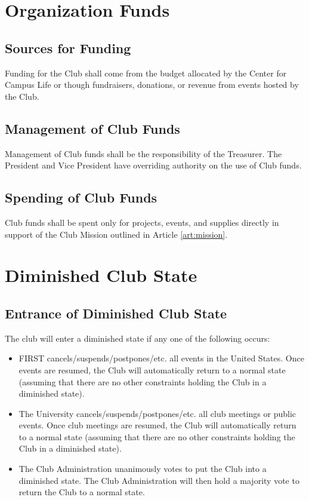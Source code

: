 \documentclass[english,11pt]{article}
\begin{document}
\section{Organization Funds} \label{art:funds}

\subsection{Sources for Funding} \label{sect:funds:sources}
Funding for the Club shall come from the budget allocated by the Center for Campus Life or though fundraisers, donations, or revenue from events hosted by the Club.

\subsection{Management of Club Funds} \label{sect:funds:management}
Management of Club funds shall be the responsibility of the Treasurer.
The President and Vice President have overriding authority on the use of Club funds.

\subsection{Spending of Club Funds} \label{sect:funds:spending}
Club funds shall be spent only for projects, events, and supplies directly in support of the Club Mission outlined in Article \ref{art:mission}.

\section{Diminished Club State} \label{art:reduced}

\subsection{Entrance of Diminished Club State} \label{sect:reduced:entrance}
The club will enter a diminished state if any one of the following occurs:

\begin{itemize}
    \item FIRST cancels/suspends/postpones/etc. all events in the United States.
        Once events are resumed, the Club will automatically return to a normal state (assuming that there are no other constraints holding the Club in a diminished state).
    \item The University cancels/suspends/postpones/etc. all club meetings or public events.
        Once club meetings are resumed, the Club will automatically return to a normal state (assuming that there are no other constraints holding the Club in a diminished state).
    \item The Club Administration unanimously votes to put the Club into a diminished state.
        The Club Administration will then hold a majority vote to return the Club to a normal state.
\end{itemize}
\end{document}
